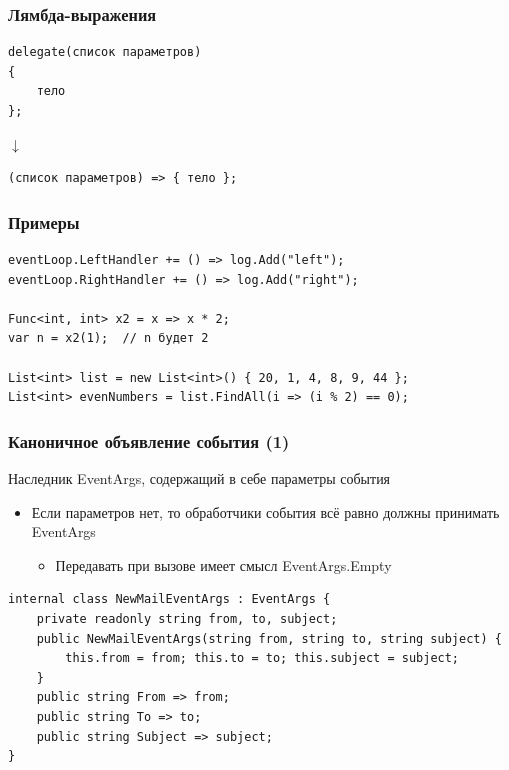\documentclass[xetex,mathserif,serif]{beamer}
\begin{document}
	\begin{frame}[fragile]
		\frametitle{Лямбда-выражения}
		\begin{verbatim}
delegate(список параметров)
{
    тело
};
		\end{verbatim}
		\hspace{2cm}\begin{LARGE}$\downarrow$\end{LARGE}
		\begin{verbatim}
(список параметров) => { тело };
		\end{verbatim}
	\end{frame}

	\begin{frame}[fragile]
		\frametitle{Примеры}
		\begin{verbatim}
eventLoop.LeftHandler += () => log.Add("left");
eventLoop.RightHandler += () => log.Add("right");

Func<int, int> x2 = x => x * 2;
var n = x2(1);  // n будет 2

List<int> list = new List<int>() { 20, 1, 4, 8, 9, 44 };
List<int> evenNumbers = list.FindAll(i => (i % 2) == 0);
		\end{verbatim}
	\end{frame}

	\begin{frame}[fragile]
		\frametitle{Каноничное объявление события (1)}
		Наследник EventArgs, содержащий в себе параметры события
		\begin{itemize}
			\item Если параметров нет, то обработчики события всё равно должны принимать EventArgs
			\begin{itemize}
				\item Передавать при вызове имеет смысл EventArgs.Empty
			\end{itemize}
		\end{itemize}

		\vspace{3mm}
		\begin{verbatim}
internal class NewMailEventArgs : EventArgs {
    private readonly string from, to, subject;
    public NewMailEventArgs(string from, string to, string subject) {
        this.from = from; this.to = to; this.subject = subject;
    }
    public string From => from;
    public string To => to;
    public string Subject => subject;
}
		\end{verbatim}
	\end{frame}
\end{document}
